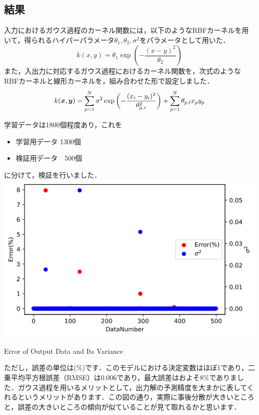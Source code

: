 \documentclass[11pt]{jsarticle}
\begin{document}
		\subsection{結果}
			入力におけるガウス過程のカーネル関数には，以下のようなRBFカーネルを用いて，得られるハイパーパラメータ$ \theta_1,\theta_2,\sigma^2 $をパラメータとして用いた．
			\begin{equation}\label{eq:RBF_Kernel}
				k(x,y) = \theta_1 \exp\left( -\frac{(x-y)^2}{\theta_2} \right)
			\end{equation}
			また，入出力に対応するガウス過程におけるカーネル関数を，次式のようなRBFカーネルと線形カーネルを，組み合わせた形で設定しました．
			\begin{equation}\label{eq:KernelForExperiment}
				k(\boldsymbol{x},\boldsymbol{y}) =  \sum_{p=1}^{N} \sigma^2 \exp\left(-\frac{(x_i-y_i)^2}{\theta_{p,r}^2}\right) + \sum_{p=1}^{N} \theta_{p,l} x_p y_p
			\end{equation}
			
			
			学習データは1800個程度あり，これを
			\begin{itemize}
				\item 学習用データ 1300個
				\item 検証用データ　500個
			\end{itemize}
			に分けて，検証を行いました．
			\bfig[H]
				\centering
				\includegraphics[scale=0.4]{./figure/ErrorVerificationDataAndVarinace.png}
				\caption{Error of Output Data and Its Variance}
			\efig
			
			ただし，誤差の単位は($ \% $)です．このモデルにおける決定変数はほぼ1であり，二乗平均平方根誤差（RMSE）は0.006であり，最大誤差はおよそ8$ \% $でありました．ガウス過程を用いるメリットとして，出力解の予測精度を大まかに表してくれるというメリットがあります．この図の通り，実際に事後分散が大きいところと，誤差の大きいところの傾向が似ていることが見て取れるかと思います．
			
\end{document}
